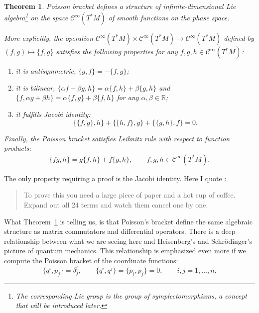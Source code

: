 \documentclass[english,fontsize=11pt,paper=b5]{scrbook}
\newtheorem{theorem}{Theorem}[chapter]
\theoremstyle{definition}
\begin{document}
    \begin{theorem}\label{thm:PoissonLieAlgebra}
      Poisson bracket defines a structure of infinite-dimensional Lie algebra\footnote{The corresponding Lie group is the group of symplectomorphisms, a concept that will be introduced later.} on the space $\mathcal{C}^\infty(T^*M)$ of smooth functions on the phase space.

      More explicitly, the operation $\mathcal{C}^\infty(T^*M)\times \mathcal{C}^\infty(T^*M) \to \mathcal{C}^\infty(T^*M)$ defined by $(f,g) \mapsto \big\{f,g\big\}$ satisfies the following properties for any $f,g,h \in \mathcal{C}^\infty(T^*M)$:
      \begin{enumerate}
        \item it is antisymmetric, $\big\{g,f\big\} = - \big\{f,g\big\}$;
        \item it is bilinear, $\big\{\alpha f + \beta g, h\big\} = \alpha\big\{f,h\big\} + \beta\big\{g,h\big\}$ and $\big\{f, \alpha g + \beta h\big\} = \alpha\big\{f,g\big\} + \beta\big\{f,h\big\}$ for any $\alpha, \beta \in\mathbb{R}$;
        \item it fulfills \emph{Jacobi identity}:
          \begin{equation}\label{eq:JacobiId}
            \big\{\big\{f,g\big\},h\big\} + \big\{\big\{h,f\big\},g\big\} + \big\{\big\{g,h\big\},f\big\} = 0.
          \end{equation}
      \end{enumerate}
      Finally, the Poisson bracket satisfies \emph{Leibnitz rule} with respect to function products:
      \begin{equation}\label{eq:LeibnitzId}
        \big\{fg, h\big\} = g\big\{f, h\big\} + f \big\{g, h\big\}, \qquad f,g,h \in \mathcal{C}^\infty(T^*M).
      \end{equation}
    \end{theorem}

    The only property requiring a proof is the Jacobi identity.
    Here I quote \cite{lectures:tong}:
    \begin{quote}
      To prove this you need a large piece of paper and a hot cup of coffee. Expand out all 24 terms and watch them cancel one by one.
    \end{quote}

    What Theorem~\ref{thm:PoissonLieAlgebra} is telling us, is that Poisson's bracket define the same algebraic structure as matrix commutators and differential operators.
    There is a deep relationship between what we are seeing here and Heisenberg's and Schr\"odinger's picture of quantum mechanics.
    This relationship is emphasized even more if we compute the Poisson bracket of the coordinate functions:
    \begin{equation}\label{eq:coordcommutators}
      \big\{q^i,p_j\big\} = \delta^i_j, \qquad \big\{q^i,q^j\big\} = \big\{p_i,p_j\big\} = 0, \qquad i,j = 1,\ldots,n.
    \end{equation}
\end{document}

